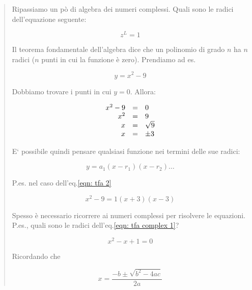 \begin{quote}
Ripassiamo un p\`o di algebra dei numeri complessi.
Quali sono le radici dell'equazione seguente:

\begin{equation}\label{eqn: icf roots}
      z^{L} = 1
\end{equation}

Il teorema fondamentale dell'algebra dice che un polinomio di grado $n$ ha $n$
radici ($n$ punti in cui la funzione \`e zero). Prendiamo ad es.

\begin{equation}\label{eqn: tfa 1}
		y = x^{2} - 9
\end{equation}

Dobbiamo trovare i punti in cui $y = 0$. Allora:

\begin{equation}\label{eqn: tfa 2}
	\begin{array}{r c l}
		x^{2} - 9 & = & 0\\
		x^{2}     & = & 9\\
		x         & = & \sqrt{9}\\
		x         & = & \pm 3\\
	\end{array}
\end{equation}


E` possibile quindi pensare qualsiasi funzione nei termini delle sue radici:

\begin{equation}\label{eqn: tfa 3}
		y = a_1 ( x - r_1 ) (x - r_2) \dots
\end{equation}

P.es. nel caso dell'eq.\ref{eqn: tfa 2}

\begin{equation}\label{eqn: tfa 4}
	x^{2} - 9 = 1 ( x + 3 ) ( x - 3 )
\end{equation}

Spesso \`e necessario ricorrere ai numeri complessi per risolvere le
equazioni. P.es., quali sono le radici dell'eq.\ref{eqn: tfa complex 1}?

\begin{equation}\label{eqn: tfa complex 1}
	x^2 - x + 1 = 0
\end{equation}

Ricordando che

\begin{equation}\label{eqn: tfa complex 2}
				x = \frac{-b \pm \sqrt{b^{2} - 4 a c}}{2 a}
\end{equation}


\end{quote}
